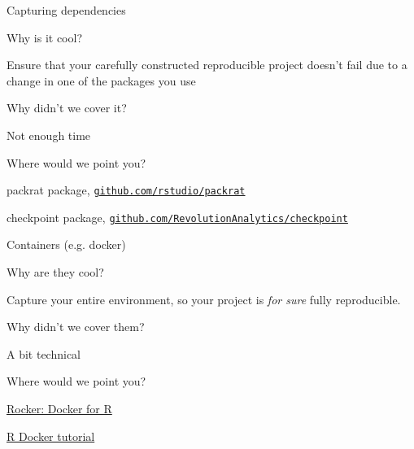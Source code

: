 \documentclass[12pt,t]{beamer}
\begin{document}
\begin{frame}[c]{Capturing dependencies}

  \bbi
\item[] Why is it cool?
  \bi
  \item Ensure that your carefully constructed reproducible project
    doesn't fail due to a change in one of the packages you use
  \ei
\item[] Why didn't we cover it?
    \bi
    \item Not enough time
    \ei
\item[] Where would we point you?
    \bi
  \item packrat package, \href{https://github.com/rstudio/packrat}{\tt github.com/rstudio/packrat}
  \item checkpoint package,
    \href{https://github.com/RevolutionAnalytics/checkpoint}{\tt github.com/RevolutionAnalytics/checkpoint}
   \ei
\ei


\end{frame}




\begin{frame}[c]{Containers (e.g. docker)}

  \bbi
\item[] Why are they cool?
  \bi
  \item Capture your entire environment, so your project is \emph{for
    sure\/} fully reproducible.
  \ei
\item[] Why didn't we cover them?
    \bi
    \item A bit technical
    \ei
\item[] Where would we point you?
    \bi
  \item
    \href{https://ropensci.org/blog/blog/2014/10/23/introducing-rocker}{Rocker:
      Docker for R}
  \item \href{http://ropenscilabs.github.io/r-docker-tutorial/}{R
    Docker tutorial}
   \ei
\ei


\end{frame}
\end{document}
